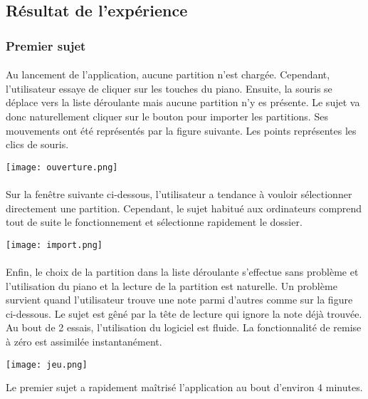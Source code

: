 \documentclass[a4paper, 12pt]{article}
\begin{document}
    \subsection{Résultat de l'expérience}
        \subsubsection{Premier sujet}
        \paragraph{}
        Au lancement de l'application, aucune partition n'est chargée. Cependant, l'utilisateur essaye de cliquer sur les touches du piano. Ensuite, la souris se déplace vers la liste déroulante mais aucune partition n'y es présente. Le sujet va donc naturellement cliquer sur le bouton pour importer les partitions. Ses mouvements ont été représentés par la figure suivante. Les points représentes les clics de souris.
        \begin{center}
        \texttt{[image: ouverture.png]}
        \end{center}
        \paragraph{}
        Sur la fenêtre suivante ci-dessous, l'utilisateur a tendance à vouloir sélectionner directement une partition. Cependant, le sujet habitué aux ordinateurs comprend tout de suite le fonctionnement et sélectionne rapidement le dossier.
        \begin{center}
        \texttt{[image: import.png]}
        \end{center}
        \paragraph{}
        Enfin, le choix de la partition dans la liste déroulante s'effectue sans problème et l'utilisation du piano et la lecture de la partition est naturelle. Un problème survient quand l'utilisateur trouve une note parmi d'autres comme sur la figure ci-dessous. Le sujet est gêné par la tête de lecture qui ignore la note déjà trouvée. Au bout de 2 essais, l'utilisation du logiciel est fluide. La fonctionnalité de remise à zéro est assimilée instantanément.
        \begin{center}
        \texttt{[image: jeu.png]}
        \end{center}
        Le premier sujet a rapidement maîtrisé l'application au bout d'environ 4 minutes.
\end{document}
